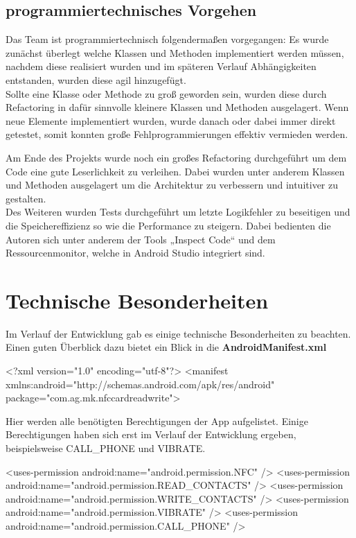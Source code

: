 \documentclass[a4paper,ngerman,12pt]{report}
\begin{document}
\subsection{programmiertechnisches Vorgehen}

Das Team ist programmiertechnisch folgendermaßen vorgegangen: Es wurde zunächst überlegt welche Klassen und Methoden implementiert werden müssen, nachdem diese realisiert wurden und im späteren Verlauf Abhängigkeiten entstanden, wurden diese agil hinzugefügt. \\
Sollte eine Klasse oder Methode zu groß geworden sein, wurden diese durch \ac{Refactoring} in dafür sinnvolle kleinere Klassen und Methoden ausgelagert. Wenn neue Elemente implementiert wurden, wurde danach oder dabei immer direkt getestet, somit konnten große Fehlprogrammierungen effektiv vermieden werden.

Am Ende des Projekts wurde noch ein großes Refactoring durchgeführt um dem Code eine gute Leserlichkeit zu verleihen. Dabei wurden unter anderem Klassen und Methoden ausgelagert um die Architektur zu verbessern und intuitiver zu gestalten. \\
Des Weiteren wurden Tests durchgeführt um letzte Logikfehler zu beseitigen und die Speichereffizienz so wie die Performance zu steigern. Dabei bedienten die Autoren sich unter anderem der Tools „Inspect Code“ und dem Ressourcenmonitor, welche in Android Studio integriert sind.

\section{Technische Besonderheiten}

Im Verlauf der Entwicklung gab es einige technische Besonderheiten zu beachten. Einen guten Überblick dazu bietet ein Blick in die {\bfseries AndroidManifest.xml} \begin{DoxyVerb}<?xml version="1.0" encoding="utf-8"?>
<manifest xmlns:android="http://schemas.android.com/apk/res/android"
    package="com.ag.mk.nfccardreadwrite">
\end{DoxyVerb}


Hier werden alle benötigten Berechtigungen der App aufgelistet. Einige Berechtigungen haben sich erst im Verlauf der Entwicklung ergeben, beispielsweise CALL\_PHONE und VIBRATE. \begin{DoxyVerb}    <uses-permission android:name="android.permission.NFC" />
    <uses-permission android:name="android.permission.READ_CONTACTS" />
    <uses-permission android:name="android.permission.WRITE_CONTACTS" />
    <uses-permission android:name="android.permission.VIBRATE" />
    <uses-permission android:name="android.permission.CALL_PHONE" />
\end{DoxyVerb}
\end{document}
